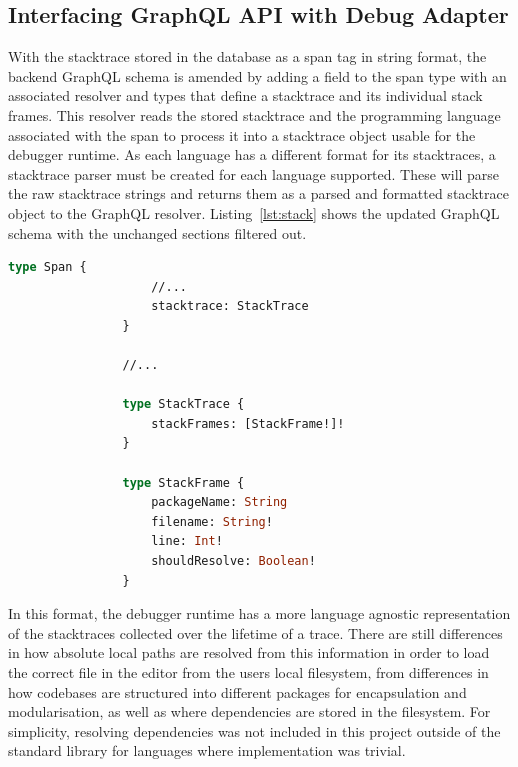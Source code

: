 \documentclass[12pt,pdftex,titlepage]{report}
\begin{document}
            \subsection{Interfacing GraphQL API with Debug Adapter}
                With the stacktrace stored in the database as a span tag in string format, the backend GraphQL schema is amended by adding a field to the span type with an associated resolver and 
                types that define a stacktrace and its individual stack frames. This resolver reads the stored stacktrace and the programming language associated with the span to process it into a 
                stacktrace object usable for the debugger runtime. As each language has a different format for its stacktraces, a stacktrace parser must be created for each language supported. These
                will parse the raw stacktrace strings and returns them as a parsed and formatted stacktrace object to the GraphQL resolver. Listing~\ref{lst:stack} shows the updated GraphQL schema
                with the unchanged sections filtered out. 

            \begin{lstlisting}[caption={[Truncated GraphQL schema with stacktrace and stackframe objects]GraphQL schema updated with stack- trace and frame objects. Unchanged fields and objects filtered.},
                language=GraphQL, gobble=16, label={lst:stack}]
                type Span {
                    //...
                    stacktrace: StackTrace
                }

                //...

                type StackTrace {
                    stackFrames: [StackFrame!]!
                }

                type StackFrame {
                    packageName: String
                    filename: String!
                    line: Int!
                    shouldResolve: Boolean!
                }
            \end{lstlisting}

            In this format, the debugger runtime has a more language agnostic representation of the stacktraces collected over the lifetime of a trace. There are still differences
            in how absolute local paths are resolved from this information in order to load the correct file in the editor from the users local filesystem, from differences in how
            codebases are structured into different packages for encapsulation and modularisation, as well as where dependencies are stored in the filesystem. For simplicity, 
            resolving dependencies was not included in this project outside of the standard library for languages where implementation was trivial.
\end{document}
